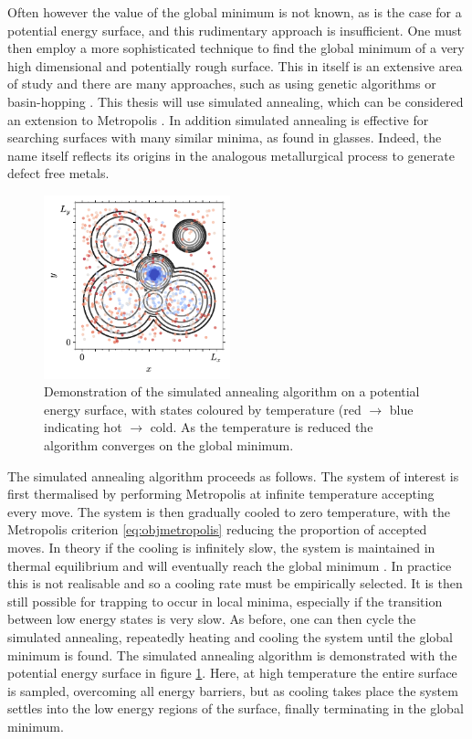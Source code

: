 Often however the value of the global minimum is not known, as is the case for a potential energy surface, and this rudimentary approach is insufficient.
One must then employ a more sophisticated technique to find the global minimum of a very high dimensional and potentially rough surface.
This in itself is an extensive area of study and there are many approaches, such as using genetic algorithms or basin\--hopping \cite{Hartke1993,Niesse1996,Wales1997}.
This thesis will use simulated annealing, which can be considered an extension to Metropolis \mc{} \cite{Kirkpatrick1983}.
In addition simulated annealing is effective for searching surfaces with many similar minima, as found in glasses.
Indeed, the name itself reflects its origins in the analogous metallurgical process to generate defect free metals.

\begin{figure}[tb]
     \centering
    \includegraphics[width=0.48\textwidth]{./figures/methods/mc_2d_sa.pdf}
      \caption{Demonstration of the simulated annealing algorithm on a \td{} potential energy surface, with states coloured by temperature (red $\rightarrow$ blue indicating hot $\rightarrow$ cold. As the temperature is reduced the algorithm converges on the global minimum.}
      \label{fig:montecarloint5}
\end{figure}

The simulated annealing algorithm proceeds as follows.
The system of interest is first thermalised by performing Metropolis \mc{} at infinite temperature \ie{} accepting every move. 
The system is then gradually cooled to zero temperature, with the Metropolis criterion \eqref{eq:objmetropolis} reducing the proportion of accepted moves.
In theory if the cooling is infinitely slow, the system is maintained in thermal equilibrium and will eventually reach the global minimum \cite{Henderson2003}.
In practice this is not realisable and so a cooling rate must be empirically selected.
It is then still possible for trapping to occur in local minima, especially if the transition between low energy states is very slow.
As before, one can then cycle the simulated annealing, repeatedly heating and cooling the system until the global minimum is found.
The simulated annealing algorithm is demonstrated with the \td{} potential energy surface in figure \ref{fig:montecarloint5}.
Here, at high temperature the entire surface is sampled, overcoming all energy barriers, but as cooling takes place the system settles into the low energy regions of the surface, finally terminating in the global minimum.

